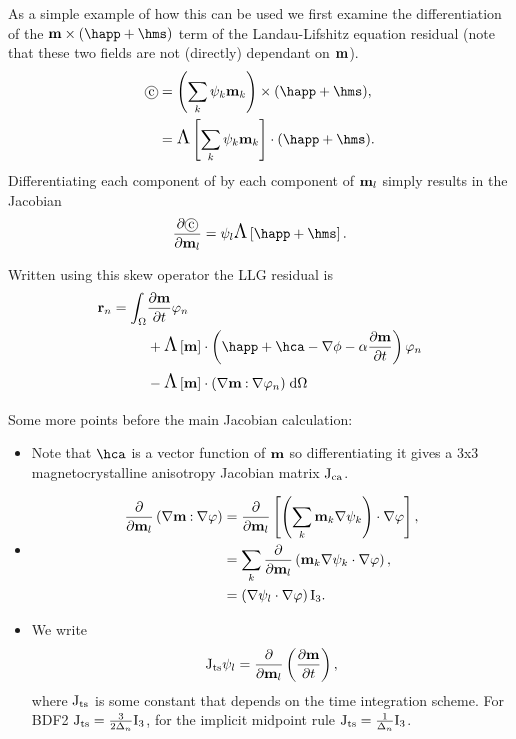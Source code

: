 As a simple example of how this can be used we first examine the differentiation of the $\mv \times (\happ + \hms)$ term of the Landau-Lifshitz equation residual (note that these two fields are not (directly) dependant on $\mathbf{m}$).
\begin{align}
  \circled{c} &= \intpb{\mv} \times (\happ + \hms), \notag\\
              &= \skewm{\intp{\mv}} \cdot (\happ + \hms).
\end{align}
Differentiating each component of  by each component of $\mathbf{m}_l$ simply results in the Jacobian
\begin{align}
  \pd{\circled{c}}{\mv_l} = \sbf_l \skewm{\happ + \hms}.
\end{align}

Written using this skew operator the LLG residual is
\begin{equation}
  \begin{aligned}
    \rllg_n = \int_{\magd}
      & \dmdt \tbf_n \\
      &+ \skewm{\mv} \cdot \left( \happ + \hca - \nabla \phi - \dampc \dmdt
        \right) \tbf_n \\
      &- \skewm{\mv} \cdot (\grad \mv \compdot \grad \tbf_n)
      \d\magd
  \end{aligned}
\end{equation} 


Some more points before the main Jacobian calculation:
\begin{itemize}
\item Note that $\hca$ is a vector function of $\mathbf{m}$ so differentiating it gives a 3x3 magnetocrystalline anisotropy Jacobian matrix $\mathrm{J}_\text{ca}$.

\item 
  \begin{equation}
    \begin{aligned}
      \frac{\partial }{\partial \mathbf{m}_l} \left(\nabla \mathbf{m} \mathbin{:} \nabla \varphi\right) 
      &= \frac{\partial }{\partial \mathbf{m}_l} \left[ \left( \sum_k \mathbf{m}_k \nabla \psi_k \right) \cdot \nabla \varphi \right], \\
      &=  \sum_k \frac{\partial }{\partial \mathbf{m}_l} \left( \mathbf{m}_k \nabla \psi_k \cdot \nabla \varphi \right), \\
      &= \left(\nabla \psi_l \cdot \nabla \varphi \right) \mathrm{I}_3.
    \end{aligned}
  \end{equation}


\item We write
  \begin{equation}
    \mathrm{J}_\text{ts} \psi_l = \frac{\partial }{\partial \mathbf{m}_l} \left(\frac{\partial \mathbf{m}}{\partial t} \right),
  \end{equation}
  where $\mathrm{J}_\text{ts}$ is some constant that depends on the time integration scheme.
  For BDF2 $\mathrm{J}_\text{ts} = \frac{3}{2\Delta_{n}} \mathrm{I}_3$, for the implicit midpoint rule $\mathrm{J}_\text{ts} = \frac{1}{\Delta_{n}} \mathrm{I}_3$.
\end{itemize}


